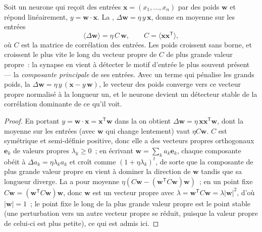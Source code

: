 \begin{theorem}\label{thm:b3:learning-memory:hebb}
Soit un neurone qui reçoit des entrées
$\mathbf{x} = (x_{1},\dots,x_{n})$ par des poids $\mathbf{w}$ et répond
linéairement, $y = \mathbf{w}\cdot\mathbf{x}$. La ,
$\Delta\mathbf{w} = \eta\, y\,\mathbf{x}$, donne en moyenne sur les
entrées
\[
\langle\Delta\mathbf{w}\rangle = \eta\,C\,\mathbf{w}, \qquad C =
\langle\mathbf{x}\mathbf{x}^{\mathsf{T}}\rangle ,
\]
où $C$ est la matrice de corrélation des entrées. Les poids croissent
sans borne, et croissent le plus vite le long du vecteur propre de $C$
de plus grande valeur propre~: la synapse en vient à détecter le motif
d'entrée le plus souvent présent --- la \emph{composante principale} de
ses entrées. Avec un terme qui pénalise les grands poids, la
\emph{}
$\Delta\mathbf{w} = \eta\, y\,(\mathbf{x} - y\,\mathbf{w})$, le
vecteur des poids converge vers ce vecteur propre
normalisé à la longueur un, et le neurone devient un détecteur stable de
la corrélation dominante de ce qu'il voit.
\end{theorem}
\begin{proof}
En portant $y = \mathbf{w}\cdot\mathbf{x} = \mathbf{x}^{\mathsf{T}}
\mathbf{w}$ dans la  on obtient $\Delta\mathbf{w} = \eta\,\mathbf{x}
\mathbf{x}^{\mathsf{T}}\mathbf{w}$, dont la moyenne sur les entrées (avec
$\mathbf{w}$ qui change lentement) vaut $\eta C\mathbf{w}$. $C$ est symétrique
et semi-définie positive, donc elle a des vecteurs propres orthogonaux $\mathbf{e}_{k}$
de valeurs propres $\lambda_{k} \ge 0$~; en écrivant $\mathbf{w} = \sum_{k}
a_{k}\mathbf{e}_{k}$, chaque composante obéit à $\Delta a_{k} = \eta\lambda_{k}
a_{k}$ et croît comme $(1 + \eta\lambda_{k})^{t}$, de sorte que la
composante de plus grande valeur propre en vient à dominer la direction
de $\mathbf{w}$ tandis que sa longueur diverge. La  a pour
moyenne $\eta(C\mathbf{w} -
(\mathbf{w}^{\mathsf{T}}C\mathbf{w})\mathbf{w})$~; en un point fixe
$C\mathbf{w} = (\mathbf{w}^{\mathsf{T}}C\mathbf{w})\mathbf{w}$, donc
$\mathbf{w}$ est un vecteur propre avec $\lambda = \mathbf{w}^{\mathsf{T}}
C\mathbf{w} = \lambda|\mathbf{w}|^{2}$, d'où $|\mathbf{w}| = 1$~; le point
fixe le long de la plus grande valeur propre est le point stable (une
perturbation vers un autre vecteur propre se réduit, puisque la valeur
propre de celui-ci est plus petite), ce qui est admis ici.
\end{proof}

